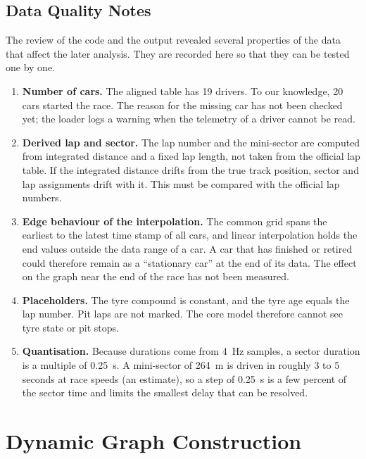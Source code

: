 \documentclass[11pt,a4paper]{article}
\begin{document}
\subsection{Data Quality Notes}
The review of the code and the output revealed several properties of the data
that affect the later analysis. They are recorded here so that they can be
tested one by one.
\begin{enumerate}[leftmargin=*]
  \item \textbf{Number of cars.} The aligned table has 19 drivers. To our
        knowledge, 20 cars started the race. The reason for the missing car
        has not been checked yet; the loader logs a warning when the
        telemetry of a driver cannot be read.
  \item \textbf{Derived lap and sector.} The lap number and the mini-sector
        are computed from integrated distance and a fixed lap length, not
        taken from the official lap table. If the integrated distance drifts
        from the true track position, sector and lap assignments drift with
        it. This must be compared with the official lap numbers.
  \item \textbf{Edge behaviour of the interpolation.} The common grid spans the
        earliest to the latest time stamp of all cars, and linear
        interpolation holds the end values outside the data range of a car.
        A car that has finished or retired could therefore remain as a
        ``stationary car'' at the end of its data. The effect on the graph
        near the end of the race has not been measured.
  \item \textbf{Placeholders.} The tyre compound is constant, and the tyre age
        equals the lap number. Pit laps are not marked. The core model
        therefore cannot see tyre state or pit stops.
  \item \textbf{Quantisation.} Because durations come from 4~Hz samples, a
        sector duration is a multiple of 0.25~s. A mini-sector of 264~m is
        driven in roughly 3 to 5 seconds at race speeds (an estimate), so a
        step of 0.25~s is a few percent of the sector time and limits the
        smallest delay that can be resolved.
\end{enumerate}

\section{Dynamic Graph Construction}
\label{sec:graph}
\end{document}
